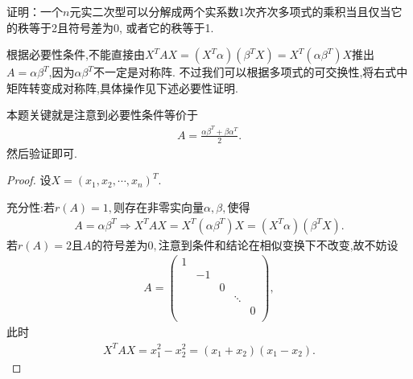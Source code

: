 \documentclass[../../main.tex]{subfiles}
\begin{document}
\begin{example}
证明：一个$n$元实二次型可以分解成两个实系数1次齐次多项式的乘积当且仅当它的秩等于2且符号差为0, 或者它的秩等于1.
\end{example}
\begin{note}
根据必要性条件,不能直接由$X^TAX=( X^T\alpha ) ( \beta ^TX ) =X^T( \alpha \beta ^T ) X$推出$A=\alpha \beta ^T$,因为$\alpha \beta ^T$不一定是对称阵.
不过我们可以根据多项式的可交换性,将右式中矩阵转变成对称阵,具体操作见下述必要性证明.

本题关键就是注意到必要性条件等价于
\begin{align*}
A=\frac{\alpha \beta ^T+\beta \alpha ^T}{2}.
\end{align*}
然后验证即可.
\end{note}
\begin{proof}
设$X=( x_1,x_2,\cdots ,x_n ) ^T$.

{\heiti 充分性:}若$r( A ) =1,$则存在非零实向量$\alpha ,\beta ,$使得
\begin{align*}
A=\alpha \beta ^T\Longrightarrow X^TAX=X^T( \alpha \beta ^T ) X=( X^T\alpha ) ( \beta ^TX ).
\end{align*}
若$r( A ) =2$且$A$的符号差为$0,$注意到条件和结论在相似变换下不改变,故不妨设
\begin{align*}
A=\begin{pmatrix}
1&		&		&		&		\\
&		-1&		&		&		\\
&		&		0&		&		\\
&		&		&		\ddots&		\\
&		&		&		&		0\\
\end{pmatrix},
\end{align*}
此时
\begin{align*}
X^TAX=x_{1}^{2}-x_{2}^{2}=( x_1+x_2 ) ( x_1-x_2 ).
\end{align*}


\end{proof}
\end{document}

